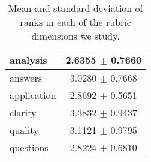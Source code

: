\begin{table}
    \begin{centering}
        \begin{tabular}{l|c}
            analysis & 2.6355 $\pm$ 0.7660
            \\\hline
            answers & 3.0280 $\pm$ 0.7668
            \\\hline
            application & 2.8692 $\pm$ 0.5651
            \\\hline
            clarity & 3.3832 $\pm$ 0.9437
            \\\hline
            quality & 3.1121 $\pm$ 0.9795
            \\\hline
            questions & 2.8224 $\pm$ 0.6810
        \end{tabular}
        \caption{Mean and standard deviation of ranks in each of the
        rubric dimensions we study.}
        \label{table:grade-stats}
    \end{centering}
\end{table}
